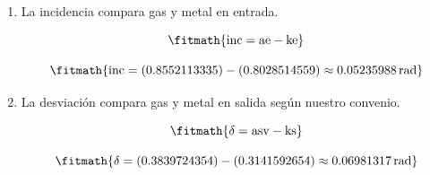 \begin{enumerate}

\item La incidencia compara gas y metal en entrada.

\[\fitmath{\mathrm{inc}=\mathrm{ae}-\mathrm{ke}}\]

\[\fitmath{\mathrm{inc}=(0.8552113335)-(0.8028514559)\approx 0.05235988\,\mathrm{rad}}\]

\item La desviación compara gas y metal en salida según nuestro convenio.

\[\fitmath{\delta=\mathrm{asv}-\mathrm{ks}}\]

\[\fitmath{\delta=(0.3839724354)-(0.3141592654)\approx 0.06981317\,\mathrm{rad}}\]

\end{enumerate}
